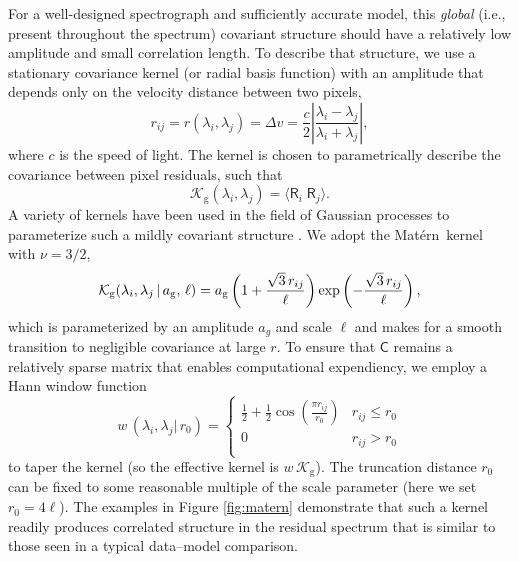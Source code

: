 \documentclass[iop,floatfix]{emulateapj}
\newcommand{\vR}{\mathsf{R}}
\newcommand{\vC}{\mathsf{C}}
\newcommand{\matern}{Mat\'{e}rn}
\newcommand{\KK}{\mathcal{K}}
\newcommand{\Kglobal}{\KK_{\textrm{g}}}
\begin{document}
For a well-designed spectrograph and sufficiently accurate model, this {\it global} (i.e., present 
throughout the spectrum) covariant structure should have a relatively low amplitude and small 
correlation length.  To describe that structure, we use a stationary covariance kernel (or radial 
basis function) with an amplitude that depends only on the velocity distance between two pixels, 
\begin{equation}
  r_{ij} = r(\lambda_i, \lambda_j) = \Delta v = \frac{c}{2} \left | \frac{\lambda_i 
   - \lambda_j}{ \lambda_i + \lambda_j} \right |,
\end{equation}
where $c$ is the speed of light.  The kernel is chosen to parametrically describe the covariance 
between pixel residuals, such that
\begin{equation}
  \Kglobal(\lambda_i, \lambda_j) =  \langle \vR_i \; \vR_j \rangle.
  \label{eqn:expectation}
\end{equation}
A variety of kernels have been used in the field of Gaussian processes to parameterize such a 
mildly covariant structure \citep[e.g.,][]{rasmussen05}.  We adopt the \matern\ kernel with $\nu = 
3/2$,
\begin{equation}
  \Kglobal(\lambda_i, \lambda_j \, |\, a_{\rm g},\, \ell) = a_{\rm g} \left(1 + \frac{\sqrt{3}\, r_{ij}}{\ell} \right ) \exp 
   \left (- \frac{\sqrt{3}\, r_{ij}}{\ell} \right ),
   \label{eqn:global}
\end{equation}
which is parameterized by an amplitude $a_g$ and scale $\ell$ and makes for a smooth transition to 
negligible covariance at large $r$.  To ensure that $\vC$ remains a relatively sparse matrix that 
enables computational expendiency, we employ a Hann window function
\begin{equation}
  w\,(\lambda_i, \lambda_j |\, r_0) = \left \{ 
    \begin{array}{cc}
    \frac{1}{2} + \frac{1}{2} \cos \left(\frac{\pi r_{ij}}{r_0} \right) & r_{ij} \le r_0 \\
    0 & r_{ij} > r_0 \\
  \end{array}
  \right .
  \label{eqn:Hann}
\end{equation}
to taper the kernel (so the effective kernel is $w \, \Kglobal$).  The truncation distance 
$r_0$ can be fixed to some reasonable multiple of the scale parameter (here we set $r_0 = 4\ell$).  
The examples in Figure \ref{fig:matern} demonstrate that such a kernel readily produces correlated 
structure in the residual spectrum that is similar to those seen in a typical data--model 
comparison.  
\end{document}
